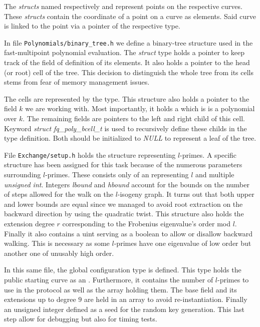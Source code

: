\documentclass[../main.tex]{subfiles}
\begin{document}
The \textit{structs} named respectively  and  represent points on the respective curves.
These \textit{structs} contain the coordinate of a point on a curve as  elements.
Said curve is linked to the point via a pointer of the respective type.

In file \texttt{Polynomials/binary\_tree.h} we define a binary-tree structure used in the fast-multipoint polynomial evaluation.
The \textit{struct} type  holds a   pointer to keep track of the field of definition of its elements.
It also holds a pointer to the head (or root) cell of the tree.
This decision to distinguish the whole tree from its cells stems from fear of memory management issues.

The cells are represented by the  type.
This structure also holds a pointer to the field $k$ we are working with.
Most importantly, it holds a  which is is a polynomial over $k$.
The remaining fields are  pointers to the left and right child of this cell.
Keyword \textit{struct fq\_poly\_bcell\_t} is used to recursively define these childs in the type definition.
Both should be initialized to \textit{NULL} to represent a leaf of the tree.

File \texttt{Exchange/setup.h} holds the  structure representing $l$-primes.
A specific structure has been assigned for this task because of the numerous parameters surrounding $l$-primes.
These consists only of an  representing $l$ and multiple \textit{unsigned int}.
Integers \textit{lbound} and \textit{hbound} account for the bounds on the number of steps allowed for the walk on the $l$-isogeny graph.
It turns out that both upper and lower bounds are equal since we managed to avoid root extraction on the backward direction by using the quadratic twist.
This structure also holds the extension degree $r$ corresponding to the Frobenius eigenvalue's order mod $l$.
Finally it also contains a uint serving as a boolean to allow or disallow backward walking.
This is necessary as some $l$-primes have one eigenvalue of low order but another one of unusably high order.

In this same file, the global configuration type  is defined.
This type holds the public starting curve as an .
Furthermore, it contains the number of $l$-primes to use in the protocol as well as the  array holding them.
The base field and its extensions up to degree $9$  are held in an  array to avoid re-instantiation.
Finally an unsigned integer defined as a seed for the random key generation.
This last step allow for debugging but also for timing tests.
\end{document}
